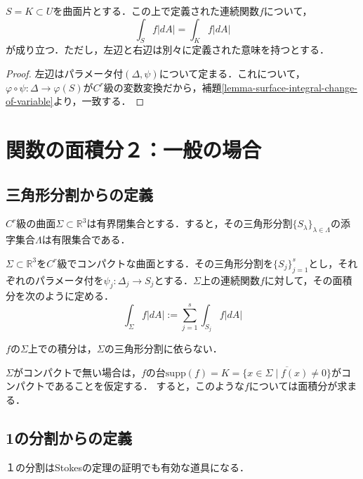 \documentclass[uplatex, dvipdfmx]{jsreport}
\begin{document}
\begin{proposition}
    $S=K\subset U$を曲面片とする．この上で定義された連続関数$f$について，
    \[ \int_Sf|dA| = \int_Kf|dA| \]
    が成り立つ．ただし，左辺と右辺は別々に定義された意味を持つとする．
\end{proposition}
\begin{proof}
    左辺はパラメータ付$(\Delta,\psi)$について定まる．これについて，$\varphi\circ\psi:\Delta\to\varphi(S)$が$C^r$級の変数変換だから，補題\ref{lemma-surface-integral-change-of-variable}より，一致する．
\end{proof}

\section{関数の面積分２：一般の場合}

\subsection{三角形分割からの定義}

\begin{lemma}[Euclid空間では有界閉集合はコンパクトである]
    $C^r$級の曲面$\Sigma\subset\mathbb{R}^3$は有界閉集合とする．すると，その三角形分割$\{S_\lambda\}_{\lambda\in\Lambda}$の添字集合$\Lambda$は有限集合である．
\end{lemma}
\begin{shadebox}
\begin{definition}
    $\Sigma\subset\mathbb{R}^3$を$C^r$級でコンパクトな曲面とする．その三角形分割を$\{S_j\}_{j=1}^s$とし，それぞれのパラメータ付を$\psi_j:\Delta_j\to S_j$とする．$\Sigma$上の連続関数$f$に対して，その面積分を次のように定める．
    \[ \int_\Sigma f|dA| := \sum^s_{j=1}\int_{S_j}f|dA| \]
\end{definition}
\end{shadebox}
\begin{theorem}
    $f$の$\Sigma$上での積分は，$\Sigma$の三角形分割に依らない．
\end{theorem}
\begin{remark*}
    $\Sigma$がコンパクトで無い場合は，$f$の台$\mathrm{supp}(f)=K=\overline{\{ x\in\Sigma\mid f(x)\ne 0 \}}$がコンパクトであることを仮定する．
    すると，このような$f$については面積分が求まる．
\end{remark*}

\subsection{1の分割からの定義}
１の分割はStokesの定理の証明でも有効な道具になる．
\end{document}
